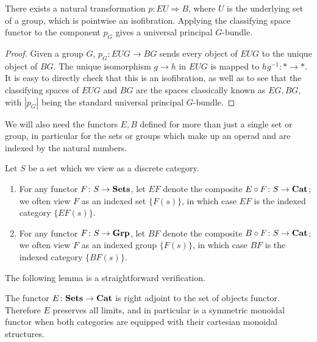 \begin{prop}
There exists a natural transformation $p \colon EU \Rightarrow B$, where $U$ is the underlying set of a group, which is pointwise an isofibration. Applying the classifying space functor to the component $p_{G}$ gives a universal principal $G$-bundle.
\end{prop}
\begin{proof}
Given a group $G$, $p_{G} \colon EUG \rightarrow BG$ sends every object of $EUG$ to the unique object of $BG$. The unique isomorphism $g \rightarrow  h$ in $EUG$ is mapped to $hg^{-1} \colon * \rightarrow *$. It is easy to directly check that this is an isofibration, as well as to see that the classifying spaces of $EUG$ and $BG$ are the spaces classically known as $EG,BG$, with $|p_{G}|$ being the standard universal principal $G$-bundle.
\end{proof}

We will also need the functors $E, B$ defined for more than just a single set or group, in particular for the sets or groups which make up an operad and are indexed by the natural numbers.

\begin{nota}\label{nota:e_b}
Let $S$ be a set which we view as a discrete category.
  \begin{enumerate}
    \item For any functor $F \colon S \rightarrow \mathbf{Sets}$, let $EF$ denote the composite $E \circ F \colon S \rightarrow \mathbf{Cat}$; we often view $F$ as an indexed set $\{ F(s) \}$, in which case $EF$ is the indexed category $\{ EF(s) \}$.
    \item For any functor $F \colon S \rightarrow \mathbf{Grp}$, let $BF$ denote the composite $B \circ F \colon S \rightarrow \mathbf{Cat}$; we often view $F$ as an indexed group $\{ F(s) \}$, in which case $BF$ is the indexed category $\{ BF(s) \}$.
  \end{enumerate}
\end{nota}

The following lemma is a straightforward verification.

\begin{lem}\label{symmoncor}
The functor $E \colon \mathbf{Sets} \rightarrow \mathbf{Cat}$ is right adjoint to the set of objects functor. Therefore $E$ preserves all limits, and in particular is a symmetric monoidal functor when both categories are equipped with their cartesian monoidal structures.
\end{lem}


